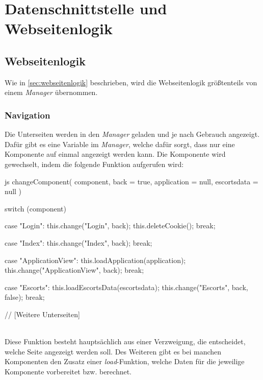 \section{Datenschnittstelle und Webseitenlogik}
\subsection{Webseitenlogik}
Wie in \autoref{sec:webseitenlogik} beschrieben, wird die Webseitenlogik größtenteils von einem \textit{Manager} übernommen.

\subsubsection{Navigation}
\label{sec:navigation}
Die Unterseiten werden in den \textit{Manager} geladen und je nach Gebrauch angezeigt. Dafür gibt es eine Variable im \textit{Manager}, welche dafür sorgt, dass nur eine Komponente auf einmal angezeigt werden kann. Die Komponente wird gewechselt, indem die folgende Funktion aufgerufen wird:
\begin{code}{js}
	changeComponent(
	component,
	back = true,
	application = null,
	escortsdata = null
	) {
		switch (component) {
			case "Login":
			this.change("Login", back);
			this.deleteCookie();
			break;
			
			case "Index":
			this.change("Index", back);
			break;
			
			case "ApplicationView":
			this.loadApplication(application);
			this.change("ApplicationView", back);
			break;
			
			case "Escorts":
			this.loadEscortsData(escortsdata);
			this.change("Escorts", back, false);
			break;
			
			// [Weitere Unterseiten]
		}
	}
\end{code}
~\\
\newpage
Diese Funktion besteht hauptsächlich aus einer Verzweigung, die entscheidet, welche Seite angezeigt werden soll.
Des Weiteren gibt es bei manchen Komponenten den Zusatz einer \textit{load}-Funktion, welche Daten für die jeweilige Komponente vorbereitet bzw. berechnet.

